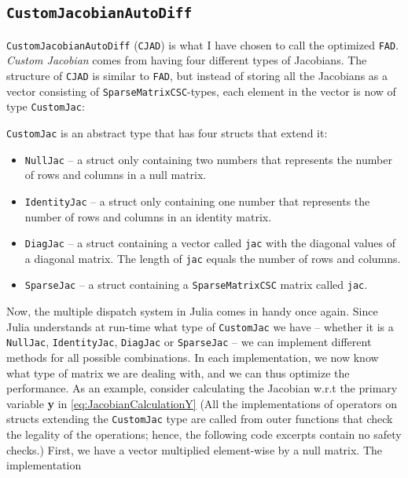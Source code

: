 \subsection{\texttt{CustomJacobianAutoDiff}}
\texttt{CustomJacobianAutoDiff} (\texttt{CJAD}) is what I have chosen to call the optimized \texttt{FAD}. \textit{Custom Jacobian} comes from having four different types of Jacobians. The structure of \texttt{CJAD} is similar to \texttt{FAD}, but instead of storing all the Jacobians as a vector consisting of \texttt{SparseMatrixCSC}-types, each element in the vector is now of type \texttt{CustomJac}:

\texttt{CustomJac} is an abstract type that has four structs that extend it:
\begin{itemize}
    \item \texttt{NullJac} -- a struct only containing two numbers that represents the number of rows and columns in a null matrix.
    \item \texttt{IdentityJac} -- a struct only containing one number that represents the number of rows and columns in an identity matrix.
    \item \texttt{DiagJac} -- a struct containing a vector called \texttt{jac} with the diagonal values of a diagonal matrix. The length of \texttt{jac} equals the number of rows and columns.
    \item \texttt{SparseJac} -- a struct containing a \texttt{SparseMatrixCSC} matrix called \texttt{jac}.
\end{itemize}
Now, the multiple dispatch system in Julia comes in handy once again. Since Julia understands at run-time what type of \texttt{CustomJac} we have -- whether it is a \texttt{NullJac}, \texttt{IdentityJac}, \texttt{DiagJac} or \texttt{SparseJac} -- we can implement different methods for all possible combinations. In each implementation, we now know what type of matrix we are dealing with, and we can thus optimize the performance. As an example, consider calculating the Jacobian w.r.t the primary variable \textbf{y} in \eqref{eq:JacobianCalculationY} (All the implementations of operators on structs extending the \texttt{CustomJac} type are called from outer functions that check the legality of the operations; hence, the following code excerpts contain no safety checks.) First, we have a vector multiplied element-wise by a null matrix. The implementation


